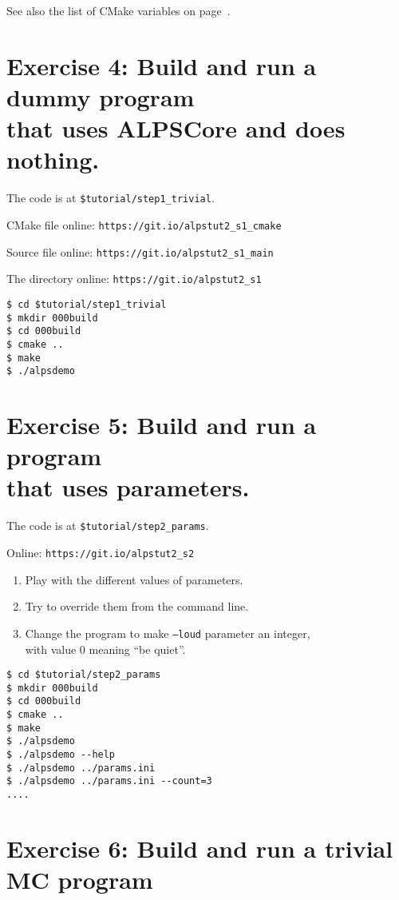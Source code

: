 \documentclass[12pt]{article}
\newcommand{\code}[1]{\texttt{#1}}
\begin{document}
See also the list of CMake variables on page~\pageref{ref:cmakevars}.

\section*{Exercise 4: Build and run a dummy program\\ that uses ALPSCore and does nothing.}

The code is at \texttt{\color{ballblue}\$tutorial/step1\_trivial}.

CMake file online: \nolinkurl{https://git.io/alpstut2_s1_cmake}

Source file online: \nolinkurl{https://git.io/alpstut2_s1_main}

The directory online: \nolinkurl{https://git.io/alpstut2_s1}

\begin{lstlisting}[emph={cd,mkdir}]
$ cd $tutorial/step1_trivial
$ mkdir 000build
$ cd 000build
$ cmake ..
$ make
$ ./alpsdemo
\end{lstlisting}%

\section*{Exercise 5: Build and run a program\\ that uses parameters.}

The code is at \texttt{\color{ballblue}\$tutorial/step2\_params}.

Online: \nolinkurl{https://git.io/alpstut2_s2}

\begin{enumerate}
\item Play with the different values of parameters.
\item Try to override them from the command line.
\item Change the program to make \code{--loud} parameter an integer,\\
      with value 0 meaning ``be quiet''.
\end{enumerate}

\begin{lstlisting}[emph={cd,mkdir}]
$ cd $tutorial/step2_params
$ mkdir 000build
$ cd 000build
$ cmake ..
$ make
$ ./alpsdemo
$ ./alpsdemo --help
$ ./alpsdemo ../params.ini
$ ./alpsdemo ../params.ini --count=3
....
\end{lstlisting}

\section*{Exercise 6: Build and run a trivial MC program}
\end{document}
